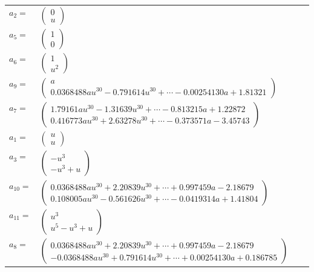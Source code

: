 \documentclass[1p]{elsarticle_modified}
\theoremstyle{definition}
\begin{document}
\begin{tabular}{m{7pt} m{180pt} m{7pt} m{180pt} }
\flushright $a_{2}=$&$\begin{pmatrix}0\\u\end{pmatrix}$ \\
\flushright $a_{5}=$&$\begin{pmatrix}1\\0\end{pmatrix}$ \\
\flushright $a_{6}=$&$\begin{pmatrix}1\\u^2\end{pmatrix}$ \\
\flushright $a_{9}=$&$\begin{pmatrix}a\\0.0368488 a u^{30}-0.791614 u^{30}+\cdots-0.00254130 a+1.81321\end{pmatrix}$ \\
\flushright $a_{7}=$&$\begin{pmatrix}1.79161 a u^{30}-1.31639 u^{30}+\cdots-0.813215 a+1.22872\\0.416773 a u^{30}+2.63278 u^{30}+\cdots-0.373571 a-3.45743\end{pmatrix}$ \\
\flushright $a_{1}=$&$\begin{pmatrix}u\\u\end{pmatrix}$ \\
\flushright $a_{3}=$&$\begin{pmatrix}- u^3\\- u^3+u\end{pmatrix}$ \\
\flushright $a_{10}=$&$\begin{pmatrix}0.0368488 a u^{30}+2.20839 u^{30}+\cdots+0.997459 a-2.18679\\0.108005 a u^{30}-0.561626 u^{30}+\cdots-0.0419314 a+1.41804\end{pmatrix}$ \\
\flushright $a_{11}=$&$\begin{pmatrix}u^3\\u^5- u^3+u\end{pmatrix}$ \\
\flushright $a_{8}=$&$\begin{pmatrix}0.0368488 a u^{30}+2.20839 u^{30}+\cdots+0.997459 a-2.18679\\-0.0368488 a u^{30}+0.791614 u^{30}+\cdots+0.00254130 a+0.186785\end{pmatrix}$ \\

\end{tabular}
\end{document}
